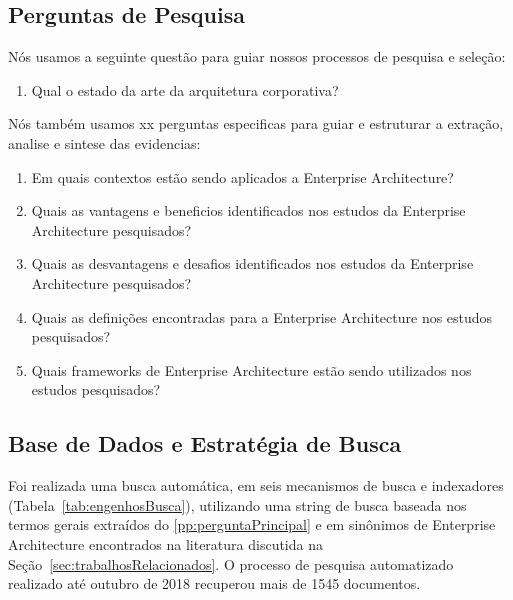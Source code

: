 \subsection{Perguntas de Pesquisa}
Nós usamos a seguinte questão para guiar nossos processos de pesquisa e seleção:

\begin{enumerate}[start=0,label={R\arabic*):}]
    \item \label{pp:perguntaPrincipal} Qual o estado da arte da arquitetura corporativa? 
\end{enumerate}

Nós também usamos xx perguntas especificas para guiar e estruturar a extração, analise e sintese das evidencias:

\begin{enumerate}[label={R\arabic*):}]
    \item Em quais contextos estão sendo aplicados a Enterprise Architecture?
    \item Quais as vantagens e beneficios identificados nos estudos da Enterprise Architecture pesquisados?
    \item Quais as desvantagens e desafios identificados nos estudos da Enterprise Architecture pesquisados?
    \item Quais as definições encontradas para a Enterprise Architecture nos estudos pesquisados?
    \item Quais frameworks de Enterprise Architecture estão sendo utilizados nos estudos pesquisados?
\end{enumerate}

\subsection{Base de Dados e Estratégia de Busca}

Foi realizada uma busca automática, em seis mecanismos de busca e indexadores (Tabela~\ref{tab:engenhosBusca}), utilizando uma string de busca baseada nos termos gerais extraídos do \ref{pp:perguntaPrincipal} e em sinônimos de Enterprise Architecture encontrados na literatura discutida na Seção~\ref{sec:trabalhosRelacionados}. O processo de pesquisa automatizado realizado até outubro de 2018 recuperou mais de 1545 documentos.

